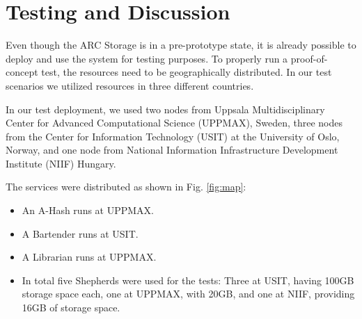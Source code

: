 \documentclass[final]{ieee}
\begin{document}
\section{Testing and Discussion}
\label{Testing and Discussion}

Even though the ARC Storage is in a pre-prototype state, it is already
possible to deploy and use the system for testing purposes. To
properly run a proof-of-concept test, the resources need to be
geographically distributed. In our test scenarios we utilized
resources in three different countries.

In our test deployment, we used two nodes from Uppsala
Multidisciplinary Center for Advanced Computational Science (UPPMAX), Sweden, 
three nodes from the Center for Information Technology (USIT) at the
University of Oslo, Norway, 
and one node from National Information Infrastructure Development Institute (NIIF)
Hungary. %

The services were distributed as shown in Fig. \ref{fig:map}:
\begin{itemize}
\item An A-Hash runs at UPPMAX.
\item A Bartender runs at USIT.
\item A Librarian runs at UPPMAX.
\item In total five Shepherds were used for the tests: Three at USIT, having
  100GB storage space each, one at UPPMAX, with 20GB, and one at NIIF, providing 16GB of storage space.
 \end{itemize}
\end{document}
